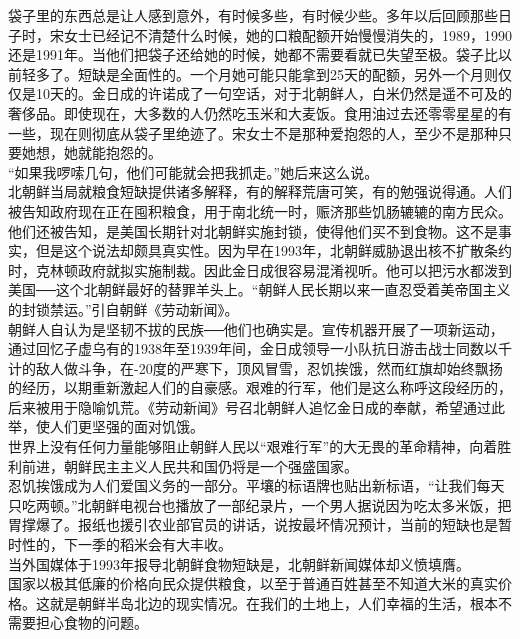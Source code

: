 袋子里的东西总是让人感到意外，有时候多些，有时候少些。多年以后回顾那些日子时，宋女士已经记不清楚什么时候，她的口粮配额开始慢慢消失的，1989，1990还是1991年。当他们把袋子还给她的时候，她都不需要看就已失望至极。袋子比以前轻多了。短缺是全面性的。一个月她可能只能拿到25天的配额，另外一个月则仅仅是10天的。金日成的许诺成了一句空话，对于北朝鲜人，白米仍然是遥不可及的奢侈品。即使现在，大多数的人仍然吃玉米和大麦饭。食用油过去还零零星星的有一些，现在则彻底从袋子里绝迹了。宋女士不是那种爱抱怨的人，至少不是那种只要她想，她就能抱怨的。\\

“如果我啰嗦几句，他们可能就会把我抓走。”她后来这么说。\\

北朝鲜当局就粮食短缺提供诸多解释，有的解释荒唐可笑，有的勉强说得通。人们被告知政府现在正在囤积粮食，用于南北统一时，赈济那些饥肠辘辘的南方民众。他们还被告知，是美国长期针对北朝鲜实施封锁，使得他们买不到食物。这不是事实，但是这个说法却颇具真实性。因为早在1993年，北朝鲜威胁退出核不扩散条约时，克林顿政府就拟实施制裁。因此金日成很容易混淆视听。他可以把污水都泼到美国──这个北朝鲜最好的替罪羊头上。“朝鲜人民长期以来一直忍受着美帝国主义的封锁禁运。”引自朝鲜《劳动新闻》。\\

朝鲜人自认为是坚韧不拔的民族──他们也确实是。宣传机器开展了一项新运动，通过回忆子虚乌有的1938年至1939年间，金日成领导一小队抗日游击战士同数以千计的敌人做斗争，在-20度的严寒下，顶风冒雪，忍饥挨饿，然而红旗却始终飘扬的经历，以期重新激起人们的自豪感。艰难的行军，他们是这么称呼这段经历的，后来被用于隐喻饥荒。《劳动新闻》号召北朝鲜人追忆金日成的奉献，希望通过此举，使人们更坚强的面对饥饿。\\

世界上没有任何力量能够阻止朝鲜人民以“艰难行军”的大无畏的革命精神，向着胜利前进，朝鲜民主主义人民共和国仍将是一个强盛国家。\\

忍饥挨饿成为人们爱国义务的一部分。平壤的标语牌也贴出新标语，“让我们每天只吃两顿。”北朝鲜电视台也播放了一部纪录片，一个男人据说因为吃太多米饭，把胃撑爆了。报纸也援引农业部官员的讲话，说按最坏情况预计，当前的短缺也是暂时性的，下一季的稻米会有大丰收。\\

当外国媒体于1993年报导北朝鲜食物短缺是，北朝鲜新闻媒体却义愤填膺。\\

国家以极其低廉的价格向民众提供粮食，以至于普通百姓甚至不知道大米的真实价格。这就是朝鲜半岛北边的现实情况。在我们的土地上，人们幸福的生活，根本不需要担心食物的问题。\\

